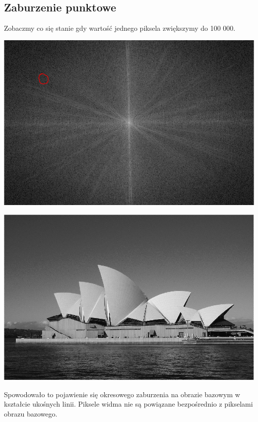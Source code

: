 \documentclass{article}
\begin{document}
	\subsection{Zaburzenie punktowe}
	Zobaczmy co się stanie gdy wartość jednego piksela zwiększymy do 100 000.
	\begin{center}
		\includegraphics[width=\linewidth]{../../lab04/white_pixel.png}
	\end{center}
	\begin{center}
		\includegraphics[width=\linewidth]{../../lab04/white_pixel_effect.png}
	\end{center}
	Spowodowało to pojawienie się okresowego zaburzenia na obrazie bazowym w kształcie ukośnych linii.
	Piksele widma nie są powiązane bezpośrednio z pikselami obrazu bazowego.
\end{document}
